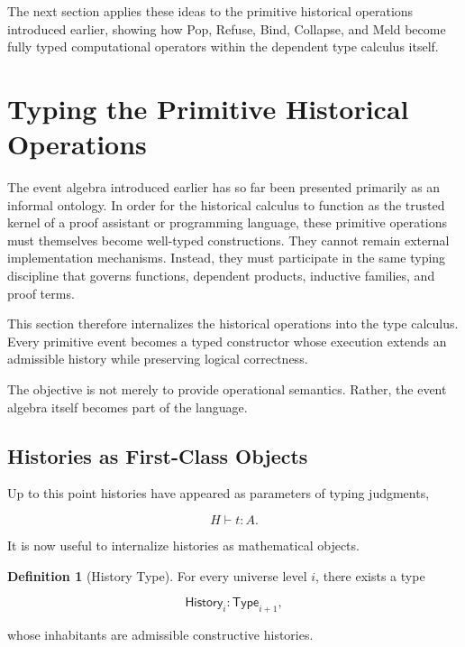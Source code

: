 \documentclass[12pt,oneside]{article}
\theoremstyle{definition}
\newtheorem{definition}[theorem]{Definition}
\theoremstyle{remark}
\newcommand{\Type}{\mathsf{Type}}
\begin{document}
The next section applies these ideas to the primitive historical operations
introduced earlier, showing how Pop, Refuse, Bind, Collapse, and Meld become
fully typed computational operators within the dependent type calculus itself.

\section{Typing the Primitive Historical Operations}

The event algebra introduced earlier has so far been presented primarily as an
informal ontology. In order for the historical calculus to function as the
trusted kernel of a proof assistant or programming language, these primitive
operations must themselves become well-typed constructions. They cannot remain
external implementation mechanisms. Instead, they must participate in the same
typing discipline that governs functions, dependent products, inductive
families, and proof terms.

This section therefore internalizes the historical operations into the type
calculus. Every primitive event becomes a typed constructor whose execution
extends an admissible history while preserving logical correctness.

The objective is not merely to provide operational semantics. Rather, the event
algebra itself becomes part of the language.

\subsection{Histories as First-Class Objects}

Up to this point histories have appeared as parameters of typing judgments,

\[
H \vdash t : A.
\]

It is now useful to internalize histories as mathematical objects.

\begin{definition}[History Type]

For every universe level \(i\), there exists a type

\[
\mathsf{History}_i : \Type_{i+1},
\]

whose inhabitants are admissible constructive histories.

\end{definition}
\end{document}
